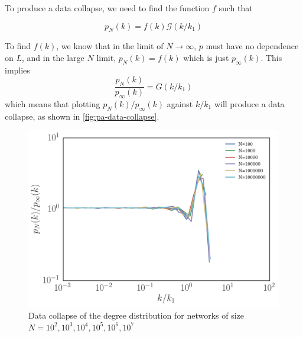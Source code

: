 To produce a data collapse, we need to find the function $f$ such that 

\begin{equation}
	p_N(k) = f(k) \mathcal{G}\left ( k / k_1 \right )
	\label{eq:data-collapse}
\end{equation}

To find $f(k)$, we know that in the limit of $N \rightarrow \infty$, $p$ must have no dependence on $L$, and in the large $N$ limit, $p_N(k) = f(k)$ which is just $p_{\infty}(k)$. This implies 
\begin{equation}
	\frac{p_N(k)}{p_{\infty}(k)} = G \left ( k / k_1 \right )
\end{equation}
which means that plotting $p_N(k) / p_{\infty}(k)$ against $k / k_1$ will produce a data collapse, as shown in \autoref{fig:pa-data-collapse}. 

\begin{figure}
    \centering
    \includegraphics[height=0.5\linewidth]{img/pa-data-collapse}
    \caption{Data collapse of the degree distribution for networks of size $N=10^2, 10^3, 10^4, 10^5, 10^6, 10^7$}
    \label{fig:pa-data-collapse}
\end{figure}